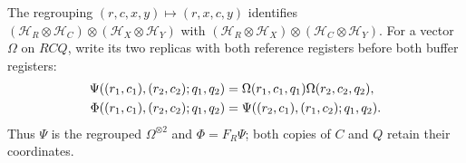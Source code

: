 \begin{definition}
    \label{def:physical_buffer_regrouping}
    \leanok
    The regrouping $(r,c,x,y)\mapsto(r,x,c,y)$ identifies
    $(\mathcal H_R\otimes\mathcal H_C)\otimes
    (\mathcal H_X\otimes\mathcal H_Y)$ with
    $(\mathcal H_R\otimes\mathcal H_X)\otimes
    (\mathcal H_C\otimes\mathcal H_Y)$.
    For a vector $\Omega$ on $RCQ$, write its two replicas with both
    reference registers before both buffer registers:
    \begin{align}
        \Psi((r_1,c_1),(r_2,c_2);q_1,q_2)
        &=\Omega(r_1,c_1,q_1)\Omega(r_2,c_2,q_2),\notag\\
        \Phi((r_1,c_1),(r_2,c_2);q_1,q_2)
        &=\Psi((r_2,c_1),(r_1,c_2);q_1,q_2).
        \notag
    \end{align}
    Thus $\Psi$ is the regrouped $\Omega^{\otimes2}$ and $\Phi=F_R\Psi$;
    both copies of $C$ and $Q$ retain their coordinates.
\end{definition}

